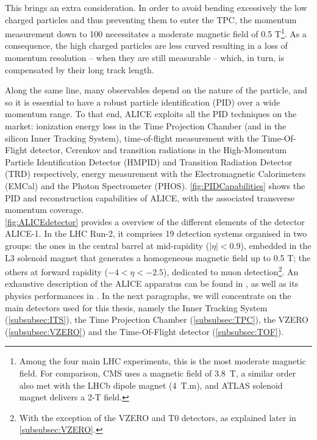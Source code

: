This brings an extra consideration. In order to avoid bending excessively the low \pT charged particles and thus preventing them to enter the TPC, the momentum measurement down to 100 \mmom necessitates a moderate magnetic field of 0.5 T\footnote{Among the four main LHC experiments, this is the most moderate magnetic field. For comparison, CMS uses a magnetic field of 3.8~T, a similar order also met with the LHCb dipole magnet (4~T.m), and ATLAS solenoid magnet delivers a 2-T field.}. As a consequence, the high \pT charged particles are less curved resulting in a loss of momentum resolution -- when they are still measurable -- which, in turn, is compensated by their long track length.

Along the same line, many observables depend on the nature of the particle, and so it is essential to have a robust particle identification (PID) over a wide momentum range. To that end, ALICE exploits all the PID techniques on the market: ionization energy loss in the Time Projection Chamber (and in the silicon Inner Tracking System), time-of-flight measurement with the Time-Of-Flight detector, Cerenkov and transition radiations in the High-Momentum Particle Identification Detector (HMPID) and Transition Radiation Detector (TRD) respectively, energy measurement with the Electromagnetic Calorimeters (EMCal) and the Photon Spectrometer (PHOS). \Fig\ref{fig:PIDCapabilities} shows the PID and reconstruction capabilities of ALICE, with the associated transverse momentum coverage.\\


\Fig\ref{fig:ALICEdetector} provides a overview of the different elements of the detector ALICE-1. In the LHC Run-2, it comprises 19 detection systems organised in two groups: the ones in the central barrel at mid-rapidity ($|\eta| < 0.9$), embedded in the L3 solenoid magnet that generates a homogeneous magnetic field up to 0.5 T; the others at forward rapidity ($-4 < \eta < -2.5$), dedicated to muon detection\footnote{With the exception of the VZERO and T0 detectors, as explained later in \Sec\ref{subsubsec:VZERO}.}. An exhaustive description of the ALICE apparatus can be found in \cite{alicecollaborationALICEExperimentCERN2008}, as well as its physics performances in \cite{carminatiALICEPhysicsPerformance2004}\cite{alicecollaborationALICEPhysicsPerformance2006}\cite{alicecollaborationPerformanceALICEExperiment2014}. In the next paragraphs, we will concentrate on the main detectors used for this thesis, namely the Inner Tracking System (\Sec\ref{subsubsec:ITS}), the Time Projection Chamber (\Sec\ref{subsubsec:TPC}), the VZERO (\Sec\ref{subsubsec:VZERO}) and the Time-Of-Flight detector (\Sec\ref{subsubsec:TOF}).

